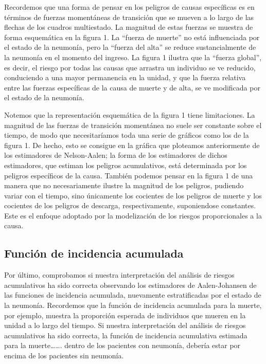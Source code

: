 \documentclass[
]{article}
\begin{document}
Recordemos que una forma de pensar en los peligros de causas específicas
es en términos de fuerzas momentáneas de transición que se mueven a lo
largo de las flechas de los cuadros multiestado. La magnitud de estas
fuerzas se muestra de forma esquemática en la figura 1. La ``fuerza de
muerte'' no está influenciada por el estado de la neumonía, pero la
``fuerza del alta'' se reduce sustancialmente de la neumonía en el
momento del ingreso. La figura 1 ilustra que la ``fuerza global'', es
decir, el riesgo por todas las causas que arrastra un individuo se ve
reducido, conduciendo a una mayor permanencia en la unidad, y que la
fuerza relativa entre las fuerzas específicas de la causa de muerte y de
alta, se ve modificada por el estado de la neumonía.

Notemos que la representación esquemática de la figura 1 tiene
limitaciones. La magnitud de las fuerzas de transición momentánea no
suele ser constante sobre el tiempo, de modo que necesitaríamos toda una
serie de gráficos como los de la figura 1. De hecho, esto se consigue en
la gráfica que ploteamos anteriormente de los estimadores de
Nelson-Aalen; la forma de los estimadores de dichos estimadores, que
estiman los peligros acumulativos, está determinada por los peligros
específicos de la causa. También podemos pensar en la figura 1 de una
manera que no necesariamente ilustre la magnitud de los peligros,
pudiendo variar con el tiempo, sino únicamente los cocientes de los
peligros de muerte y los cocientes de los peligros de descarga,
respectivamente, suponiendose constantes. Este es el enfoque adoptado
por la modelización de los riesgos proporcionales a la causa.

\hypertarget{funciuxf3n-de-incidencia-acumulada}{%
\subsection{Función de incidencia
acumulada}\label{funciuxf3n-de-incidencia-acumulada}}

Por último, comprobamos si nuestra interpretación del análisis de
riesgos acumulativos ha sido correcta observando los estimadores de
Aalen-Johansen de las funciones de incidencia acumulada, nuevamente
estratificadas por el estado de la neumonía. Recordemos que la función
de incidencia acumulada para la muerte, por ejemplo, muestra la
proporción esperada de individuos que mueren en la unidad a lo largo del
tiempo. Si nuestra interpretación del análisis de riesgos acumulativos
ha sido correcta, la función de incidencia acumulativa estimada para la
muerte\ldots\ldots. dentro de los pacientes con neumonía, debería estar
por encima de los pacientes sin neumonía.
\end{document}
